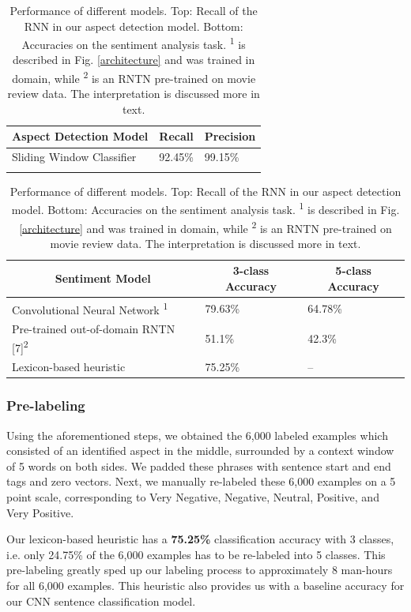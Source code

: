 \documentclass{article} %
\begin{document}
\begin{table}[t]
\begin{center}
\begin{tabular}{lll}
\multicolumn{1}{c}{\bf Aspect Detection Model}  &\multicolumn{1}{c}{\bf Recall}  &\multicolumn{1}{c}{\bf Precision} \\ \hline
Sliding Window Classifier & 92.45\%  & 99.15\%\\
&\\
\end{tabular}
\begin{tabular}{lll}
\multicolumn{1}{c}{\bf Sentiment Model}  &\multicolumn{1}{c}{\bf 3-class Accuracy} &\multicolumn{1}{c}{\bf 5-class Accuracy} \\ \hline
 Convolutional Neural Network \textsuperscript{1} & 79.63\% & 64.78\% \\
 Pre-trained out-of-domain RNTN [7]\textsuperscript{2}       & 51.1\% & 42.3\% \\
 Lexicon-based heuristic	& 75.25\% & -- \\
\end{tabular}
\end{center}
\caption{Performance of different models. Top: Recall of the RNN in our aspect detection model. Bottom: Accuracies on the sentiment analysis task. \textsuperscript{1} is described in Fig. \ref{architecture} and was trained in domain, while \textsuperscript{2} is an RNTN pre-trained on movie review data. The interpretation is discussed more in text.}
\label{ModelResultsTable}
\end{table}

\subsubsection{Pre-labeling}
Using the aforementioned steps, we obtained the 6,000 labeled examples which consisted of an identified aspect in the middle, surrounded by a context window of 5 words on both sides. We padded these phrases with sentence start and end tags and zero vectors. Next, we manually re-labeled these 6,000 examples on a 5 point scale, corresponding to Very Negative, Negative, Neutral, Positive, and Very Positive. 

Our lexicon-based heuristic has a \textbf{75.25\%} classification accuracy with 3 classes, i.e. only 24.75\% of the 6,000 examples has to be re-labeled into 5 classes. This pre-labeling greatly sped up our labeling process to approximately 8 man-hours for all 6,000 examples. This heuristic also provides us with a baseline accuracy for our CNN sentence classification model.
\end{document}
